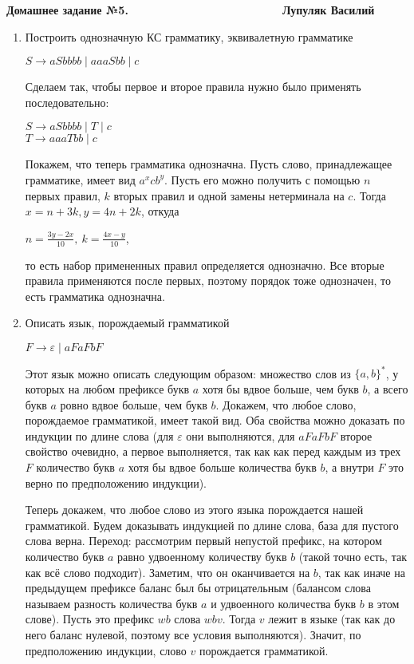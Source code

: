 \documentclass[12pt]{article}
\def\to{\rightarrow}
\def\b{\textbf}
\newenvironment{Problems}{
	\begin{enumerate}[]
	}{       
	\end{enumerate}
}
\begin{document}
	\b{Домашнее задание №5.\ \ \ \ \ \ \ \ \ \ \ \ \ \ \ \ \ \ \ \ \ \ \ \  Лупуляк Василий}
	
	\begin{Problems}
		\item [\fbox{2.}] Построить однозначную КС грамматику, эквивалетную грамматике
		\begin{center}
			$S \to aSbbbb \mid aaaSbb \mid c$\\
		\end{center}
		
		Сделаем так, чтобы первое и второе правила нужно было применять последовательно:
		\begin{center}
			$S \to aSbbbb \mid T \mid c$\\
			$T \to aaaTbb \mid c$
		\end{center}
	  	Покажем, что теперь грамматика однозначна. Пусть слово, принадлежащее грамматике, имеет вид $a^xcb^y$. Пусть его можно получить с помощью $n$ первых правил, $k$ вторых правил и одной замены нетерминала на $c$. Тогда $x = n + 3k, y = 4n + 2k$, откуда 
	  	\begin{center}
	  		$n = \frac{3y - 2x}{10},\ k = \frac{4x - y}{10}$,
	  	\end{center}
  		то есть набор примененных правил определяется однозначно. Все вторые правила применяются после первых, поэтому порядок тоже однозначен, то есть грамматика однозначна.
  		
		\item [\fbox{3.}] Описать язык, порождаемый грамматикой 
		\begin{center}
			$F \to \varepsilon \mid aFaFbF$
		\end{center}
		Этот язык можно описать следующим образом: множество слов из $\{a,b\}^*$, у которых на любом префиксе букв $a$ хотя бы вдвое больше, чем букв $b$, а всего букв $a$ ровно вдвое больше, чем букв $b$. Докажем, что любое слово, порождаемое грамматикой, имеет такой вид. Оба свойства можно доказать по индукции по длине слова (для $\varepsilon$ они выполняются, для $aFaFbF$ второе свойство очевидно, а первое выполняется, так как как перед каждым из трех $F$ количество букв $a$ хотя бы вдвое больше количества букв $b$, а внутри $F$ это верно по предположению индукции).
		
		Теперь докажем, что любое слово из этого языка порождается нашей грамматикой. Будем доказывать индукцией по длине слова, база для пустого слова верна. Переход: рассмотрим первый непустой префикс, на котором количество букв $a$ равно удвоенному количеству букв $b$ (такой точно есть, так как всё слово подходит). Заметим, что он оканчивается на $b$, так как иначе на предыдущем префиксе баланс был бы отрицательным (балансом слова называем разность количества букв $a$ и удвоенного количества букв $b$ в этом слове). Пусть это префикс $wb$ слова $wbv$. Тогда $v$ лежит в языке (так как до него баланс нулевой, поэтому все условия выполняются). Значит, по предположению индукции, слово $v$ порождается грамматикой.
		

\end{Problems}
\end{document}
